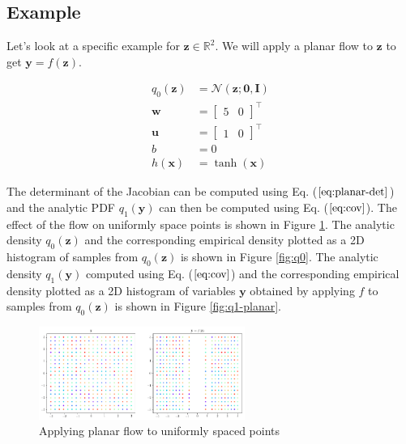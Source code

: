 \documentclass[]{article}
\begin{document}
\subsection{Example}

Let's look at a specific example for $\mathbf{z}\in\mathbb{R}^2$. We will apply a planar flow to $\mathbf{z}$ to get $\mathbf{y} = f(\mathbf{z})$.


\begin{align*}
q_0(\mathbf{z}) &= \mathcal{N}(\mathbf{z};\mathbf{0},\mathbf{I})\\
\mathbf{w} &= \begin{bmatrix}5 & 0\end{bmatrix}^\top\\
\mathbf{u} &= \begin{bmatrix}1 & 0\end{bmatrix}^\top\\
b &= 0\\
h(\mathbf{x}) &= \tanh(\mathbf{x})
\end{align*}

The determinant of the Jacobian can be computed using Eq. ($\ref{eq:planar-det}$) and the analytic PDF $q_1(\mathbf{y})$ can then be computed using Eq. ($\ref{eq:cov}$). The effect of the flow on uniformly space points is shown in Figure \ref{fig:planar-points}. The analytic density $q_0(\mathbf{z})$ and the corresponding empirical density plotted as a 2D histogram of samples from $q_0(\mathbf{z})$ is shown in Figure \ref{fig:q0}. The analytic density $q_1(\mathbf{y})$ computed using Eq. ($\ref{eq:cov}$) and the corresponding empirical density plotted as a 2D histogram of variables $\mathbf{y}$ obtained by applying $f$ to samples from $q_0(\mathbf{z})$ is shown in Figure \ref{fig:q1-planar}.

\begin{figure}
		\centering
	\includegraphics[width=0.6\textwidth]{planar-points}
	\caption{Applying planar flow to uniformly spaced points}
	\label{fig:planar-points}
\end{figure}
\end{document}
